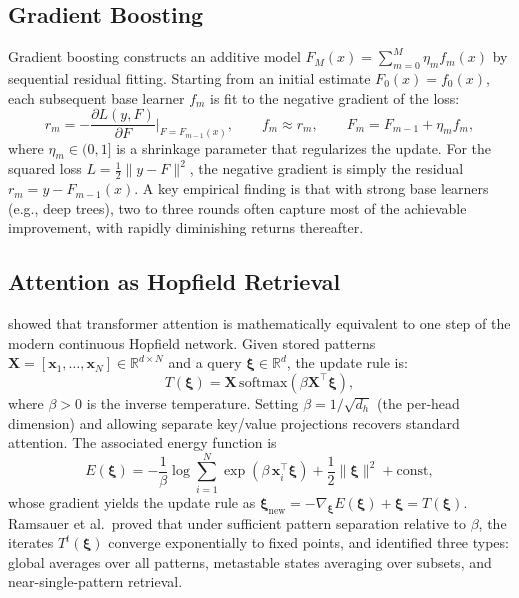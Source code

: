 \documentclass{article}
\theoremstyle{definition}
\begin{document}
\subsection{Gradient Boosting}

Gradient boosting \citep{friedman2001greedy} constructs an additive model $F_M(x) = \sum_{m=0}^{M} \eta_m f_m(x)$ by sequential residual fitting.
Starting from an initial estimate $F_0(x) = f_0(x)$, each subsequent base learner $f_m$ is fit to the negative gradient of the loss:
\begin{equation}
\label{eq:boosting}
    r_m = -\frac{\partial L(y, F)}{\partial F}\bigg|_{F=F_{m-1}(x)}, \qquad f_m \approx r_m, \qquad F_m = F_{m-1} + \eta_m f_m,
\end{equation}
where $\eta_m \in (0, 1]$ is a shrinkage parameter that regularizes the update.
For the squared loss $L = \frac{1}{2}\|y - F\|^2$, the negative gradient is simply the residual $r_m = y - F_{m-1}(x)$.
A key empirical finding is that with strong base learners (e.g., deep trees), two to three rounds often capture most of the achievable improvement, with rapidly diminishing returns thereafter.

\subsection{Attention as Hopfield Retrieval}

\citet{ramsauer2021hopfield} showed that transformer attention is mathematically equivalent to one step of the modern continuous Hopfield network.
Given stored patterns $\mathbf{X} = [\mathbf{x}_1, \ldots, \mathbf{x}_N] \in \mathbb{R}^{d \times N}$ and a query $\boldsymbol{\xi} \in \mathbb{R}^d$, the update rule is:
\begin{equation}
\label{eq:hopfield}
    T(\boldsymbol{\xi}) = \mathbf{X} \, \mathrm{softmax}(\beta \mathbf{X}^\top \boldsymbol{\xi}),
\end{equation}
where $\beta > 0$ is the inverse temperature.
Setting $\beta = 1/\sqrt{d_h}$ (the per-head dimension) and allowing separate key/value projections recovers standard attention.
The associated energy function is
\begin{equation}
\label{eq:energy}
    E(\boldsymbol{\xi}) = -\frac{1}{\beta}\log\sum_{i=1}^{N} \exp(\beta \, \mathbf{x}_i^\top \boldsymbol{\xi}) + \frac{1}{2}\|\boldsymbol{\xi}\|^2 + \text{const},
\end{equation}
whose gradient yields the update rule as $\boldsymbol{\xi}_{\text{new}} = -\nabla_{\boldsymbol{\xi}} E(\boldsymbol{\xi}) + \boldsymbol{\xi} = T(\boldsymbol{\xi})$.
Ramsauer et al.\ proved that under sufficient pattern separation relative to $\beta$, the iterates $T^t(\boldsymbol{\xi})$ converge exponentially to fixed points, and identified three types: global averages over all patterns, metastable states averaging over subsets, and near-single-pattern retrieval.
\end{document}
